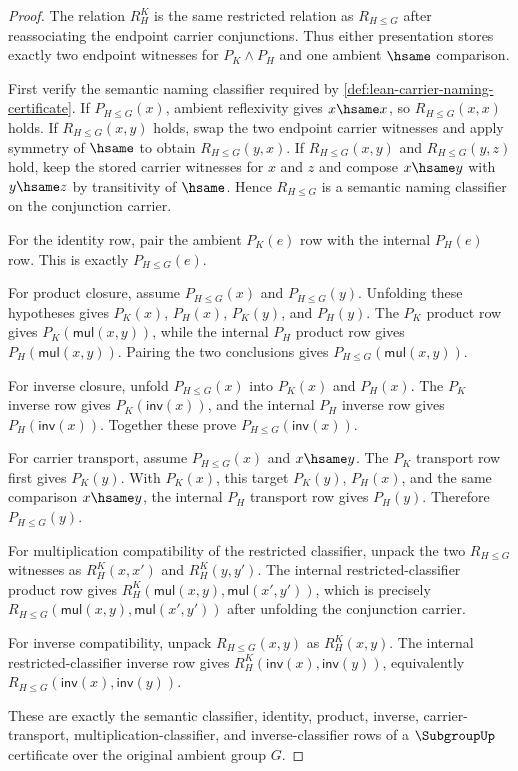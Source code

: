 \begin{proof}
The relation $R_H^K$ is the same restricted relation as $R_{H\leq G}$ after
reassociating the endpoint carrier conjunctions. Thus either presentation
stores exactly two endpoint witnesses for $P_K\land P_H$ and one ambient
$\hsame$ comparison.

First verify the semantic naming classifier required by
\autoref{def:lean-carrier-naming-certificate}. If $P_{H\leq G}(x)$, ambient
reflexivity gives $x\hsame x$, so $R_{H\leq G}(x,x)$ holds. If
$R_{H\leq G}(x,y)$ holds, swap the two endpoint carrier witnesses and apply
symmetry of $\hsame$ to obtain $R_{H\leq G}(y,x)$. If
$R_{H\leq G}(x,y)$ and $R_{H\leq G}(y,z)$ hold, keep the stored carrier
witnesses for $x$ and $z$ and compose $x\hsame y$ with $y\hsame z$ by
transitivity of $\hsame$. Hence $R_{H\leq G}$ is a semantic naming classifier
on the conjunction carrier.

For the identity row, pair the ambient $P_K(e)$ row with the internal
$P_H(e)$ row. This is exactly $P_{H\leq G}(e)$.

For product closure, assume $P_{H\leq G}(x)$ and $P_{H\leq G}(y)$. Unfolding
these hypotheses gives $P_K(x)$, $P_H(x)$, $P_K(y)$, and $P_H(y)$. The
$P_K$ product row gives $P_K(\mathsf{mul}(x,y))$, while the internal $P_H$
product row gives $P_H(\mathsf{mul}(x,y))$. Pairing the two conclusions gives
$P_{H\leq G}(\mathsf{mul}(x,y))$.

For inverse closure, unfold $P_{H\leq G}(x)$ into $P_K(x)$ and $P_H(x)$. The
$P_K$ inverse row gives $P_K(\mathsf{inv}(x))$, and the internal $P_H$ inverse
row gives $P_H(\mathsf{inv}(x))$. Together these prove
$P_{H\leq G}(\mathsf{inv}(x))$.

For carrier transport, assume $P_{H\leq G}(x)$ and $x\hsame y$. The $P_K$
transport row first gives $P_K(y)$. With $P_K(x)$, this target $P_K(y)$,
$P_H(x)$, and the same comparison $x\hsame y$, the internal $P_H$ transport
row gives $P_H(y)$. Therefore $P_{H\leq G}(y)$.

For multiplication compatibility of the restricted classifier, unpack the two
$R_{H\leq G}$ witnesses as $R_H^K(x,x')$ and $R_H^K(y,y')$. The internal
restricted-classifier product row gives
$R_H^K(\mathsf{mul}(x,y),\mathsf{mul}(x',y'))$, which is precisely
$R_{H\leq G}(\mathsf{mul}(x,y),\mathsf{mul}(x',y'))$ after unfolding the
conjunction carrier.

For inverse compatibility, unpack $R_{H\leq G}(x,y)$ as $R_H^K(x,y)$. The
internal restricted-classifier inverse row gives
$R_H^K(\mathsf{inv}(x),\mathsf{inv}(y))$, equivalently
$R_{H\leq G}(\mathsf{inv}(x),\mathsf{inv}(y))$.

These are exactly the semantic classifier, identity, product, inverse,
carrier-transport, multiplication-classifier, and inverse-classifier rows of a
$\SubgroupUp$ certificate over the original ambient group $G$.
\end{proof}

